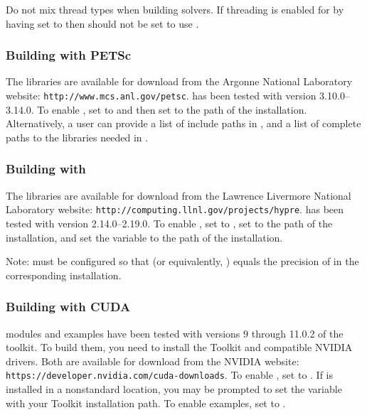 \noindent Do not mix thread types when building {\sundials} solvers.  If
threading is enabled for {\sundials} by having  set to
 then {\superludist} should not be set to use {\openmp}.{\warn}

\subsubsection*{Building with PETSc}
\label{ss:building_with_petsc}
The {\petsc} libraries are available for download from the Argonne National
Laboratory website: {\tt http://www.mcs.anl.gov/petsc}. {\sundials} has been
tested with {\petsc} version 3.10.0--3.14.0. To enable {\petsc}, set
 to  and then set  to the path of the
{\petsc} installation. Alternatively, a user can provide a list of include paths
in , and a list of complete paths to the libraries needed in
.


\subsubsection*{Building with {\hypre}}
The {\hypre} libraries are available for download from the Lawrence Livermore
National Laboratory website: {\tt http://computing.llnl.gov/projects/hypre}.
{\sundials} has been tested with {\hypre} version 2.14.0--2.19.0.  To enable
{\hypre}, set   to , set  to
the  path of the {\hypre} installation, and set the variable
 to the  path of the {\hypre} installation.

Note: {\sundials} must be configured so that  (or
equivalently, ) equals the precision of
 in the corresponding {\hypre} installation.


\subsubsection*{Building with CUDA}
{\sundials} {\cuda} modules and examples have been tested with versions 9
through 11.0.2 of the {\cuda} toolkit. To build them, you need to install the
Toolkit and compatible NVIDIA drivers. Both are available for download from the
NVIDIA website: {\tt https://developer.nvidia.com/cuda-downloads}. To enable
{\cuda}, set  to . If {\cuda} is installed in a
nonstandard location, you may be prompted to set the variable
 with your {\cuda} Toolkit installation path. To
enable {\cuda} examples, set  to .

